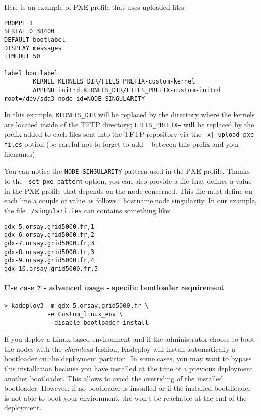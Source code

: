 \documentclass[a4wide,10pt,oneside]{book}
\begin{document}
Here is an example of PXE profile that uses uploaded files:
\begin{verbatim}
PROMPT 1
SERIAL 0 38400
DEFAULT bootlabel
DISPLAY messages
TIMEOUT 50

label bootlabel
        KERNEL KERNELS_DIR/FILES_PREFIX-custom-kernel
        APPEND initrd=KERNELS_DIR/FILES_PREFIX-custom-initrd root=/dev/sda3 node_id=NODE_SINGULARITY
\end{verbatim}

In this example, \texttt{KERNELS\_DIR} will be replaced by the directory where the kernels are located inside of the TFTP directory; \texttt{FILES\_PREFIX--} will be replaced by the prefix added to each files sent into the TFTP repository via the \texttt{-x|--upload-pxe-files} option (be careful not to forget to add \texttt{--} between this prefix and your filenames).

You can notice the \texttt{NODE\_SINGULARITY} pattern used in the PXE profile. Thanks to the \texttt{--set-pxe-pattern} option, you can also provide a file that defines a value in the PXE profile that depends on the node concerned. This file must define on each line a couple of value as follows : hostname,node singularity. In our example, the file \texttt{~/singularities} can contains something like:
\begin{verbatim}
gdx-5.orsay.grid5000.fr,1
gdx-6.orsay.grid5000.fr,2
gdx-7.orsay.grid5000.fr,3
gdx-8.orsay.grid5000.fr,3
gdx-9.orsay.grid5000.fr,4
gdx-10.orsay.grid5000.fr,5
\end{verbatim}

\paragraph{Use case 7 - advanced usage - specific bootloader requirement}
\begin{verbatim}
> kadeploy3 -m gdx-5.orsay.grid5000.fr \
            -e Custom_linux_env \
            --disable-bootloader-install
\end{verbatim}
If you deploy a Linux based environment and if the administrator choose to boot the nodes with the \textit{chainload} fashion, Kadeploy will install automatically a bootloader on the deployment partition. In some cases, you may want to bypass this installation because you have installed at the time of a previous deployment another bootloader. This allows to avoid the overriding of the installed bootloader. However, if no bootloader is installed or if the installed bootdloader is not able to boot your environment, the won't be reachable at the end of the deployment.
\end{document}
